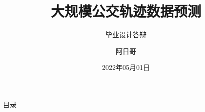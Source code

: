 \documentclass[aspectratio=1610]{beamer}
\author{阿日哥}
\title{大规模公交轨迹数据预测}
\subtitle{毕业设计答辩}
\institute{武汉大学计算机学院}
\date{2022年05月01日}
\begin{document}
\kaishu
\maketitle
\begin{frame}{目录}
    \transfade %
    \inserttableofcontent
\end{frame}







\end{document}
